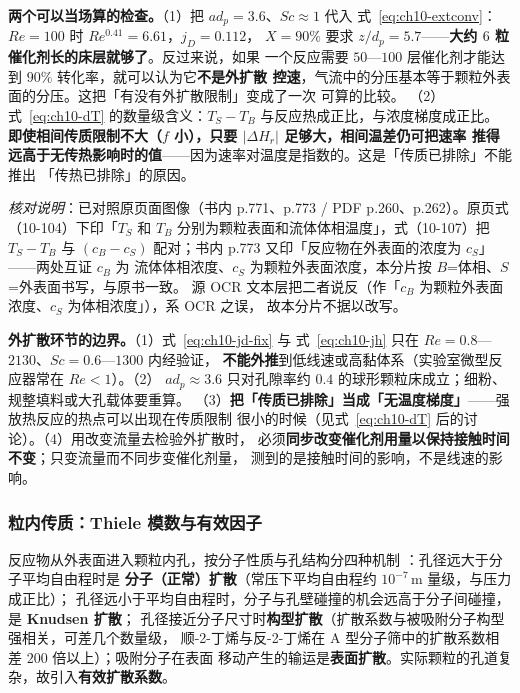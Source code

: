 \textbf{两个可以当场算的检查。}（1）把 $ad_p=3.6$、$Sc\approx1$ 代入
式~\eqref{eq:ch10-extconv}：$Re=100$ 时 $Re^{0.41}=6.61$，$j_D=0.112$，
$X=90\%$ 要求 $z/d_p=5.7$——\textbf{大约 $6$ 粒催化剂长的床层就够了}。反过来说，如果
一个反应需要 $50$—$100$ 层催化剂才能达到 $90\%$ 转化率，就可以认为它\textbf{不是外扩散
控速}，气流中的分压基本等于颗粒外表面的分压。这把「有没有外扩散限制」变成了一次
可算的比较。
（2）式~\eqref{eq:ch10-dT} 的数量级含义：$T_S-T_B$ 与反应热成正比，与浓度梯度成正比。
\textbf{即使相间传质限制不大（$f$ 小），只要 $|\Delta H_r|$ 足够大，相间温差仍可把速率
推得远高于无传热影响时的值}——因为速率对温度是指数的。这是「传质已排除」不能推出
「传热已排除」的原因。

\emph{核对说明}：已对照原页面图像（书内 p.771、p.773 / PDF p.260、p.262）。原页式
（10-104）下印「$T_S$ 和 $T_B$ 分别为颗粒表面和流体体相温度」，式（10-107）把 $T_S-T_B$
与 $(c_B-c_S)$ 配对；书内 p.773 又印「反应物在外表面的浓度为 $c_S$」——两处互证 $c_B$ 为
流体体相浓度、$c_S$ 为颗粒外表面浓度，本分片按 $B$=体相、$S$=外表面书写，与原书一致。
源 OCR 文本层把二者说反（作「$c_B$ 为颗粒外表面浓度、$c_S$ 为体相浓度」），系 OCR 之误，
故本分片不据以改写。

\begin{pitfall}
\textbf{外扩散环节的边界。}（1）式~\eqref{eq:ch10-jd-fix} 与
式~\eqref{eq:ch10-jh} 只在 $Re=0.8$—$2130$、$Sc=0.6$—$1300$ 内经验证，
\textbf{不能外推}到低线速或高黏体系（实验室微型反应器常在 $Re<1$）。（2）
$ad_p\approx3.6$ 只对孔隙率约 $0.4$ 的球形颗粒床成立；细粉、规整填料或大孔载体要重算。
（3）\textbf{把「传质已排除」当成「无温度梯度」}——强放热反应的热点可以出现在传质限制
很小的时候（见式~\eqref{eq:ch10-dT} 后的讨论）。（4）用改变流量去检验外扩散时，
必须\textbf{同步改变催化剂用量以保持接触时间不变}；只变流量而不同步变催化剂量，
测到的是接触时间的影响，不是线速的影响。
\end{pitfall}

\subsubsection{粒内传质：Thiele 模数与有效因子}

反应物从外表面进入颗粒内孔，按分子性质与孔结构分四种机制
：孔径远大于分子平均自由程时是
\textbf{分子（正常）扩散}（常压下平均自由程约 $10^{-7}$\,\unit{m} 量级，与压力成正比）；
孔径远小于平均自由程时，分子与孔壁碰撞的机会远高于分子间碰撞，是 \textbf{Knudsen 扩散}；
孔径接近分子尺寸时\textbf{构型扩散}（扩散系数与被吸附分子构型强相关，可差几个数量级，
顺-2-丁烯与反-2-丁烯在 A 型分子筛中的扩散系数相差 $200$ 倍以上）；吸附分子在表面
移动产生的输运是\textbf{表面扩散}。实际颗粒的孔道复杂，故引入\textbf{有效扩散系数}。

